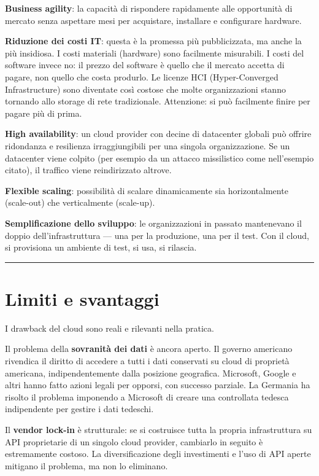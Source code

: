 \documentclass[
  italian,
  openany]{book}
\begin{document}
\textbf{Business agility}: la capacità di rispondere rapidamente alle
opportunità di mercato senza aspettare mesi per acquistare, installare e
configurare hardware.

\textbf{Riduzione dei costi IT}: questa è la promessa più pubblicizzata,
ma anche la più insidiosa. I costi materiali (hardware) sono facilmente
misurabili. I costi del software invece no: il prezzo del software è
quello che il mercato accetta di pagare, non quello che costa produrlo.
Le licenze HCI (Hyper-Converged Infrastructure) sono diventate così
costose che molte organizzazioni stanno tornando allo storage di rete
tradizionale. Attenzione: si può facilmente finire per pagare più di
prima.

\textbf{High availability}: un cloud provider con decine di datacenter
globali può offrire ridondanza e resilienza irraggiungibili per una
singola organizzazione. Se un datacenter viene colpito (per esempio da
un attacco missilistico come nell'esempio citato), il traffico viene
reindirizzato altrove.

\textbf{Flexible scaling}: possibilità di scalare dinamicamente sia
horizontalmente (scale-out) che verticalmente (scale-up).

\textbf{Semplificazione dello sviluppo}: le organizzazioni in passato
mantenevano il doppio dell'infrastruttura --- una per la produzione, una
per il test. Con il cloud, si provisiona un ambiente di test, si usa, si
rilascia.

\begin{center}\rule{0.5\linewidth}{0.5pt}\end{center}

\section{Limiti e svantaggi}\label{limiti-e-svantaggi}

I drawback del cloud sono reali e rilevanti nella pratica.

Il problema della \textbf{sovranità dei dati} è ancora aperto. Il
governo americano rivendica il diritto di accedere a tutti i dati
conservati su cloud di proprietà americana, indipendentemente dalla
posizione geografica. Microsoft, Google e altri hanno fatto azioni
legali per opporsi, con successo parziale. La Germania ha risolto il
problema imponendo a Microsoft di creare una controllata tedesca
indipendente per gestire i dati tedeschi.

Il \textbf{vendor lock-in} è strutturale: se si costruisce tutta la
propria infrastruttura su API proprietarie di un singolo cloud provider,
cambiarlo in seguito è estremamente costoso. La diversificazione degli
investimenti e l'uso di API aperte mitigano il problema, ma non lo
eliminano.
\end{document}
